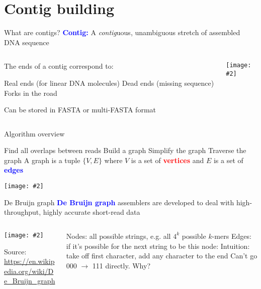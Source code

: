 \documentclass{beamer}
\renewcommand{\c}[1]{\begin{center}#1\end{center}}
\newcommand{\blu}[1]{\textcolor{blue}{\textbf{#1}}}
\newcommand{\red}[1]{\textcolor{red}{\textbf{#1}}}
\newcommand{\gr}[2][.95]{\c{\texttt{[image: \#2]}}}
\begin{document}
\section{Contig building}

\begin{frame}{What are contigs?}
\blu{Contig:} A \textit{contig}uous, unambiguous stretch of assembled DNA sequence
\begin{columns}
\begin{column}{0.4\textwidth}
    The ends of a contig correspond to:\\
    \bigskip
    \begin{outline}
        \1 Real ends (for linear DNA molecules)
        \1 Dead ends (missing sequence)
        \1 Forks in the road
    \end{outline}
    Can be stored in FASTA or multi-FASTA format
\end{column}
\begin{column}{0.4\textwidth}
    \gr{l4_figs/s12_contig.png}
\end{column}
\end{columns}
\end{frame}

\begin{frame}{Algorithm overview}
\begin{outline}
    \1[] Find all overlaps between reads
    \1[] Build a graph
    \1[] Simplify the graph
    \1[] Traverse the graph
    \2 A graph is a tuple $\{V, E\}$ where $V$ is a set of \red{vertices} and $E$ is a set of \blu{edges}
\end{outline}
\gr{l4_figs/s13_contig_building.png}
\end{frame}

\begin{frame}{De Bruijn graph}
    \blu{De Bruijn graph} assemblers are developed to deal with high-throughput, highly accurate short-read data
    \begin{columns}
    \begin{column}{0.5\textwidth}
        \gr{l4_figs/s0_debruijn.png}
        \tiny Source: \url{https://en.wikipedia.org/wiki/De_Bruijn_graph}
    \end{column}
    \begin{column}{0.5\textwidth}
        \begin{outline}
            \1 Nodes: all possible strings, e.g. all $4^k$ possible $k$-mers
            \1 Edges: if it's possible for the next string to be this node:
                \2 Intuition: take off first character, add any character to the end
                \2 Can't go 000 $\to$ 111 directly. Why?
        \end{outline}
    \end{column}
    \end{columns}
\end{frame}
\end{document}
